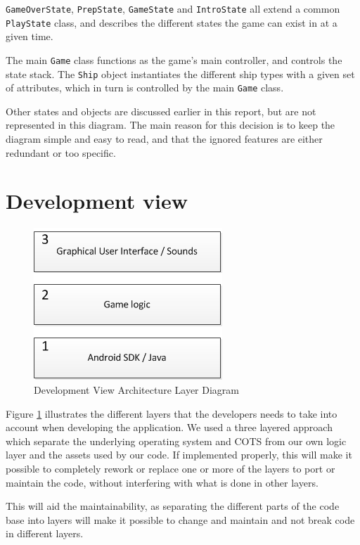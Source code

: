 \texttt{GameOverState}, \texttt{PrepState}, \texttt{GameState} and \texttt{IntroState} all extend a common \texttt{PlayState} class, and describes the different states the game can exist in at a given time.

The main \texttt{Game} class functions as the game's main controller, and controls the state stack. The \texttt{Ship} object instantiates the different ship types with a given set of attributes, which in turn is controlled by the main \texttt{Game} class.

Other states and objects are discussed earlier in this report, but are not represented in this diagram. The main reason for this decision is to keep the diagram simple and easy to read, and that the ignored features are either redundant or too specific.



\section{Development view}


\begin{figure}[ht]
	\centering
    \includegraphics[scale=0.65]{DevelopmentView.png}
    \caption{Development View Architecture Layer Diagram}
    \label{fig:DevelopmentView}
\end{figure}

Figure \ref{fig:DevelopmentView} illustrates the different layers that the developers needs to take into account when developing the application. We used a three layered approach which separate the underlying operating system and COTS from our own logic layer and the assets used by our code. If implemented properly, this will make it possible to completely rework or replace one or more of the layers to port or maintain the code, without interfering with what is done in other layers.

This will aid the maintainability, as separating the different parts of the code base into layers will make it possible to change and maintain and not break code in different layers.

